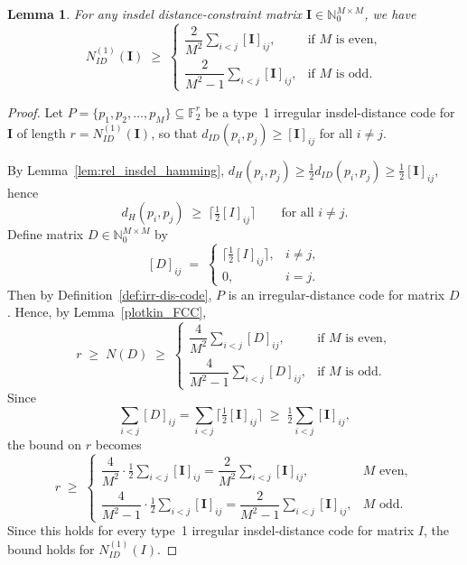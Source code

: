 \documentclass[11 pt]{article}
\numberwithin{equation}{section}
\newtheorem{lemma}[theorem]{Lemma}
\begin{document}
   

    \begin{lemma}
    \label{plotk}
    For any insdel distance-constraint matrix $\mathbf{I} \in \mathbb{N}_0^{M \times M}$, we have
    \[
    N^{(1)}_{ID}(\bm{I}) \;\geq\; 
    \begin{cases}
        \dfrac{2}{M^2} \displaystyle\sum_{i < j} [\bm{I}]_{ij}, 
        & \text{if } M \text{ is even}, \\[1.2ex]
        \dfrac{2}{M^2 - 1} \displaystyle\sum_{i < j} [\bm{I}]_{ij}, 
        & \text{if } M \text{ is odd}.
    \end{cases}
    \]
    \end{lemma}

    \begin{proof}
        Let $P = \{p_1, p_2, \ldots, p_M\} \subseteq \mathbb{F}_2^{r}$ be a type~1 irregular insdel-distance code for $\bm{I}$ of length $r = N^{(1)}_{ID}(\bm{I})$, so that $d_{ID}(p_i, p_j) \geq [\bm{I}]_{ij}$ for all $i \neq j$.

        \smallskip
        \noindent
        By Lemma~\ref{lem:rel_insdel_hamming}, $d_H(p_i, p_j) \geq \tfrac{1}{2} d_{ID}(p_i, p_j) \geq \tfrac{1}{2} [\bm{I}]_{ij}$, hence
        \[
         d_H(p_i, p_j) \;\geq\; \big\lceil \tfrac{1}{2}[I]_{ij} \big\rceil \qquad \text{for all } i \neq j.
        \]
        Define matrix $D \in \mathbb{N}_0^{M \times M}$ by
        \[
        [D]_{ij} \;=\; 
        \begin{cases}
        \big\lceil \tfrac{1}{2}[I]_{ij} \big\rceil, & i \neq j, \\
        0, & i = j.
        \end{cases}
        \]
        Then by Definition~\ref{def:irr-dis-code}, $P$ is an irregular-distance code for matrix $D$. Hence, by Lemma~\ref{plotkin_FCC},
        \[
        r \;\geq\; N(D) \;\geq\; 
        \begin{cases}
        \dfrac{4}{M^2} \displaystyle\sum_{i<j} [D]_{ij}, 
        & \text{if } M \text{ is even}, \\[1.2ex]
        \dfrac{4}{M^2 - 1} \displaystyle\sum_{i<j} [D]_{ij}, 
        & \text{if } M \text{ is odd}.
    \end{cases}
        \]
        Since
        \[
        \sum_{i<j} [D]_{ij} 
        = \sum_{i<j} \big\lceil \tfrac{1}{2}[\bm{I}]_{ij} \big\rceil 
         \;\geq\; \tfrac{1}{2} \sum_{i<j} [\bm{I}]_{ij},
        \]
        the bound on $r$ becomes
        \[
        r \;\geq\; 
        \begin{cases}
        \dfrac{4}{M^2} \cdot \tfrac{1}{2} \displaystyle\sum_{i<j} [\bm{I}]_{ij} 
        = \dfrac{2}{M^2} \displaystyle\sum_{i<j} [\bm{I}]_{ij}, 
        & M \text{ even}, \\[1.4ex]
        \dfrac{4}{M^2 - 1} \cdot \tfrac{1}{2} \displaystyle\sum_{i<j} [\bm{I}]_{ij} 
        = \dfrac{2}{M^2 - 1} \displaystyle\sum_{i<j} [\bm{I}]_{ij}, 
        & M \text{ odd}.
    \end{cases}
        \]
    Since this holds for every type~1 irregular insdel-distance code for matrix $I$, the bound holds for $N^{(1)}_{ID}(I)$.
    \end{proof}
\end{document}
